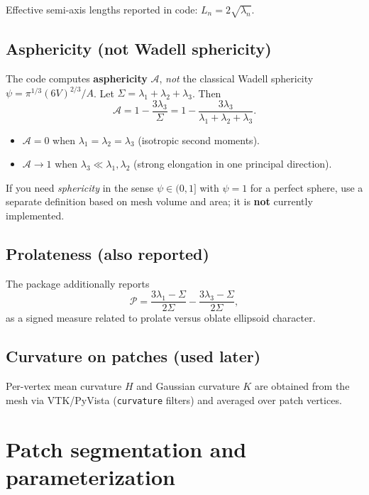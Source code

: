 \documentclass[11pt,a4paper]{article}
\begin{document}
Effective semi-axis lengths reported in code:
$L_n = 2\sqrt{\lambda_n}$.

\subsection{Asphericity (not Wadell sphericity)}

The code computes \textbf{asphericity} $\mathcal{A}$, \emph{not} the classical
Wadell sphericity $\psi = \pi^{1/3}(6V)^{2/3}/A$.
Let $\Sigma=\lambda_1+\lambda_2+\lambda_3$. Then
\begin{equation}
  \boxed{
    \mathcal{A}
    = 1 - \frac{3\lambda_3}{\Sigma}
    = 1 - \frac{3\lambda_3}{\lambda_1+\lambda_2+\lambda_3}.
  }
  \label{eq:asphericity}
\end{equation}
\begin{itemize}
  \item $\mathcal{A}=0$ when $\lambda_1=\lambda_2=\lambda_3$ (isotropic second moments).
  \item $\mathcal{A}\to 1$ when $\lambda_3\ll\lambda_1,\lambda_2$ (strong elongation
        in one principal direction).
\end{itemize}
If you need \emph{sphericity} in the sense $\psi\in(0,1]$ with $\psi=1$ for a perfect
sphere, use a separate definition based on mesh volume and area; it is \textbf{not}
currently implemented.

\subsection{Prolateness (also reported)}

The package additionally reports
\begin{equation}
  \mathcal{P}
  = \frac{3\lambda_1-\Sigma}{2\Sigma}
    - \frac{3\lambda_3-\Sigma}{2\Sigma},
\end{equation}
as a signed measure related to prolate versus oblate ellipsoid character.

\subsection{Curvature on patches (used later)}

Per-vertex mean curvature $H$ and Gaussian curvature $K$ are obtained from the mesh
via VTK/PyVista (\texttt{curvature} filters) and averaged over patch vertices.

\section{Patch segmentation and parameterization}
\end{document}
